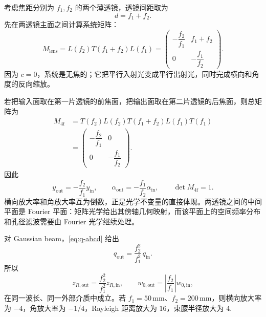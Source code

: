 考虑焦距分别为 \(f_1,f_2\) 的两个薄透镜，透镜间距取为
\[
	d=f_1+f_2.
\]
先在两透镜主面之间计算系统矩阵：
\begin{equation}
	M_{\mathrm{lens}}=
	L(f_2)T(f_1+f_2)L(f_1)
	=
	\begin{pmatrix}
		-\dfrac{f_2}{f_1}&f_1+f_2\\[6pt]
		0&-\dfrac{f_1}{f_2}
	\end{pmatrix}.
\end{equation}
因为 \(c=0\)，系统是无焦的；它把平行入射光变成平行出射光，同时完成横向和角度的反向缩放。

若把输入面取在第一片透镜的前焦面，把输出面取在第二片透镜的后焦面，则总矩阵为
\begin{align}
	M_{\mathrm{4f}}
	&=T(f_2)L(f_2)T(f_1+f_2)L(f_1)T(f_1)\\
	&=
	\begin{pmatrix}
		-\dfrac{f_2}{f_1}&0\\[6pt]
		0&-\dfrac{f_1}{f_2}
	\end{pmatrix}.
\end{align}
因此
\begin{equation}
	y_{\mathrm{out}}=-\frac{f_2}{f_1}y_{\mathrm{in}},
\qquad
\alpha_{\mathrm{out}}=-\frac{f_1}{f_2}\alpha_{\mathrm{in}},
\qquad
\det M_{\mathrm{4f}}=1.
\end{equation}
横向放大率和角放大率互为倒数，正是光学不变量的直接体现。两透镜之间的中间平面是 Fourier 平面：矩阵光学给出其傍轴几何映射，而该平面上的空间频率分布和孔径滤波需要由 Fourier 光学继续处理。

对 Gaussian beam，\cref{eq:q-abcd} 给出
\begin{equation}
	q_{\mathrm{out}}
	=\frac{f_2^2}{f_1^2}\,q_{\mathrm{in}}.
\end{equation}
所以
\begin{equation}
	z_{R,\mathrm{out}}=\frac{f_2^2}{f_1^2}z_{R,\mathrm{in}},
\qquad
	w_{0,\mathrm{out}}=\left|\frac{f_2}{f_1}\right|w_{0,\mathrm{in}},
\end{equation}
在同一波长、同一外部介质中成立。若 \(f_1=50\,\mathrm{mm}\)、\(f_2=200\,\mathrm{mm}\)，则横向放大率为 \(-4\)，角放大率为 \(-1/4\)，Rayleigh 距离放大为 \(16\)，束腰半径放大为 \(4\).
